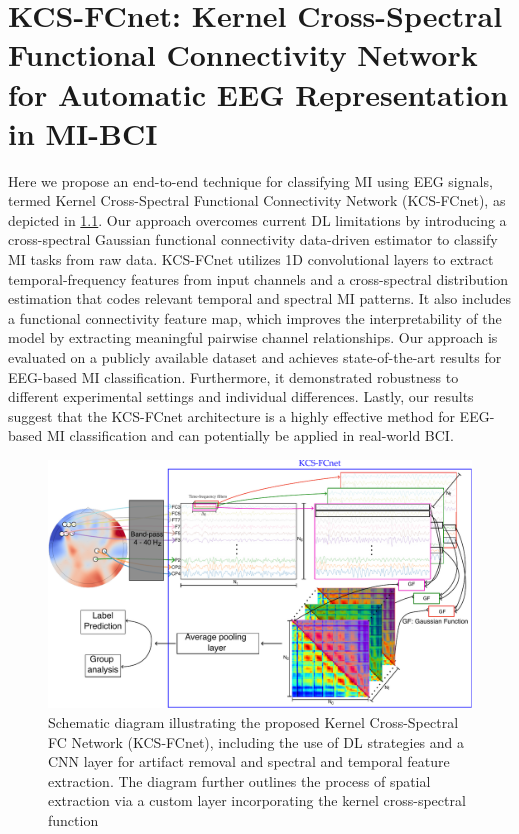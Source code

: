 \chapter[Kernel Cross-Spectral Functional Connectivity Network]{KCS-FCnet: Kernel Cross-Spectral Functional Connectivity Network for Automatic EEG Representation in MI-BCI}\label{chapter_2}


Here we propose an end-to-end technique for classifying MI using EEG signals, termed Kernel Cross-Spectral Functional Connectivity Network (KCS-FCnet), as depicted in \cref{fig:contribution2}. Our approach overcomes current DL limitations by introducing a cross-spectral Gaussian functional connectivity data-driven estimator to classify MI tasks from raw data. KCS-FCnet utilizes 1D convolutional layers to extract temporal-frequency features from input channels and a cross-spectral distribution estimation that codes relevant temporal and spectral MI patterns. It also includes a functional connectivity feature map, which improves the interpretability of the model by extracting meaningful pairwise channel relationships. Our approach is evaluated on a publicly available dataset and achieves state-of-the-art results for EEG-based MI classification. Furthermore, it demonstrated robustness to different experimental settings and individual differences. Lastly, our results suggest that the KCS-FCnet architecture is a highly effective method for EEG-based MI classification and can potentially be applied in real-world BCI.

\begin{figure}[h!]
    \centering
    \includegraphics[scale=0.6]{Figures/outline_and_contributions/contribution2.pdf}
    \caption{Schematic diagram illustrating the proposed Kernel Cross-Spectral FC Network (KCS-FCnet), including the use of DL strategies and a CNN layer for artifact removal and spectral and temporal feature extraction. The diagram further outlines the process of spatial extraction via a custom layer incorporating the kernel cross-spectral function}\label{fig:contribution2}
\end{figure}

